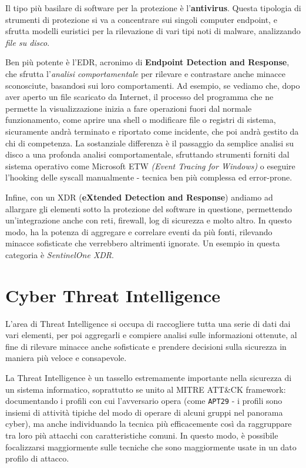 Il tipo più basilare di software per la protezione è l'\textbf{antivirus}. Questa tipologia di strumenti di protezione si va a concentrare sui singoli computer endpoint, e sfrutta modelli euristici per la rilevazione di vari tipi noti di malware, analizzando \emph{file su disco}.

Ben più potente è l'EDR, acronimo di \textbf{Endpoint Detection and Response}, che sfrutta l'\emph{analisi comportamentale} per rilevare e contrastare anche minacce sconosciute, basandosi sui loro comportamenti. Ad esempio, se vediamo che, dopo aver aperto un file scaricato da Internet, il processo del programma che ne permette la visualizzazione inizia a fare operazioni fuori dal normale funzionamento, come aprire una shell o modificare file o registri di sistema, sicuramente andrà terminato e riportato come incidente, che poi andrà gestito da chi di competenza.
La sostanziale differenza è il passaggio da semplice analisi su disco a una profonda analisi comportamentale, sfruttando strumenti forniti dal sistema operativo come Microsoft ETW \emph{(Event Tracing for Windows)} o eseguire l'hooking delle syscall manualmente - tecnica ben più complessa ed error-prone.

Infine, con un XDR (\textbf{eXtended Detection and Response}) andiamo ad allargare gli elementi sotto la protezione del software in questione, permettendo un'integrazione anche con reti, firewall, log di sicurezza e molto altro.
In questo modo, ha la potenza di aggregare e correlare eventi da più fonti, rilevando minacce sofisticate che verrebbero altrimenti ignorate.
Un esempio in questa categoria è \emph{SentinelOne XDR}.

\section{Cyber Threat Intelligence}
\label{chap:cyber_threat_intelligence}
L'area di Threat Intelligence si occupa di raccogliere tutta una serie di dati dai vari elementi,
per poi aggregarli e compiere analisi sulle informazioni ottenute, al fine di rilevare minacce anche sofisticate e prendere decisioni sulla sicurezza in maniera più veloce e consapevole.

La Threat Intelligence è un tassello estremamente importante nella sicurezza di un sistema informatico, soprattutto se unito al MITRE ATT\&CK framework: documentando i profili con cui l'avversario opera (come \texttt{APT29} - i profili sono insiemi di attività tipiche del modo di operare di alcuni gruppi nel panorama cyber), ma anche individuando la tecnica più efficacemente così da raggruppare tra loro più attacchi con caratteristiche comuni.
In questo modo, è possibile focalizzarsi maggiormente sulle tecniche che sono maggiormente usate in un dato profilo di attacco.

